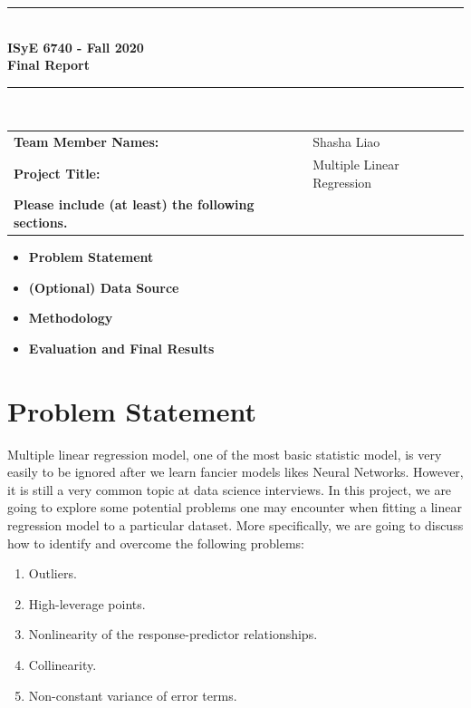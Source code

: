\documentclass{article}
\begin{document}
\begin{titlepage}
	\clearpage\thispagestyle{empty}
	\centering
	\vspace{1cm}
		
	\rule{\linewidth}{1mm} \\[0.5cm]
	{ \Huge \bfseries ISyE 6740 - Fall 2020\\[0.2cm]
		Final Report}\\[0.5cm]
	\rule{\linewidth}{1mm} \\[1cm]
	
		\begin{tabular}{l p{5cm}}
		\textbf{Team Member Names:} & Shasha Liao  \\[10pt]
		\textbf{Project Title:} & Multiple Linear Regression \\[10pt]
		\textbf{Please include (at least) the following sections.} & \\
		\end{tabular} 

        \begin{itemize}
            \item[] \textbf{Problem Statement}
            \item[] \textbf{(Optional) Data Source}
            \item[] \textbf{Methodology}
            \item[] \textbf{Evaluation and Final Results}
        \end{itemize}
	
	\pagebreak

\end{titlepage}
\tableofcontents
\newpage
\section{Problem Statement} 
Multiple linear regression model, one of the most basic statistic model, is very easily to be ignored after we learn fancier models likes Neural Networks. However, it is still a very common topic at data science interviews. In this project, we are going to explore some potential problems one may encounter when fitting a linear regression model to a particular dataset. More specifically, we are going to discuss how to identify and overcome the following problems:
\begin{enumerate}
\item Outliers.
\item High-leverage points.
\item Nonlinearity of the response-predictor relationships.
\item Collinearity.
\item Non-constant variance of error terms.
\end{enumerate}
\end{document}
